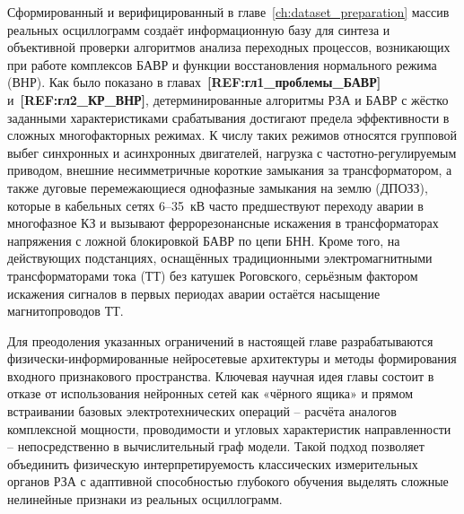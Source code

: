 Сформированный и верифицированный в главе~\ref{ch:dataset_preparation}
массив реальных осциллограмм создаёт информационную базу для синтеза
и объективной проверки алгоритмов анализа переходных процессов,
возникающих при работе комплексов БАВР и функции восстановления
нормального режима (ВНР). Как было показано в главах~\textbf{[REF:гл1\_проблемы\_БАВР]}
и~\textbf{[REF:гл2\_КР\_ВНР]}, детерминированные алгоритмы РЗА и БАВР
с жёстко заданными характеристиками срабатывания достигают предела
эффективности в сложных многофакторных режимах. К числу таких режимов
относятся групповой выбег синхронных и асинхронных двигателей,
нагрузка с частотно-регулируемым приводом, внешние несимметричные
короткие замыкания за трансформатором, а также дуговые перемежающиеся
однофазные замыкания на землю (ДПОЗЗ), которые в кабельных сетях
6--35~кВ часто предшествуют переходу аварии в многофазное КЗ и вызывают
феррорезонансные искажения в трансформаторах напряжения с ложной
блокировкой БАВР по цепи БНН. Кроме того, на действующих подстанциях,
оснащённых традиционными электромагнитными трансформаторами тока (ТТ)
без катушек Роговского, серьёзным фактором искажения сигналов в первых
периодах аварии остаётся насыщение магнитопроводов ТТ.

Для преодоления указанных ограничений в настоящей главе разрабатываются
физически-информированные нейросетевые архитектуры и методы формирования
входного признакового пространства. Ключевая научная идея главы состоит
в отказе от использования нейронных сетей как «чёрного ящика» и прямом
встраивании базовых электротехнических операций -- расчёта аналогов
комплексной мощности, проводимости и угловых характеристик направленности --
непосредственно в вычислительный граф модели. Такой подход позволяет
объединить физическую интерпретируемость классических измерительных
органов РЗА с адаптивной способностью глубокого обучения выделять
сложные нелинейные признаки из реальных осциллограмм.

